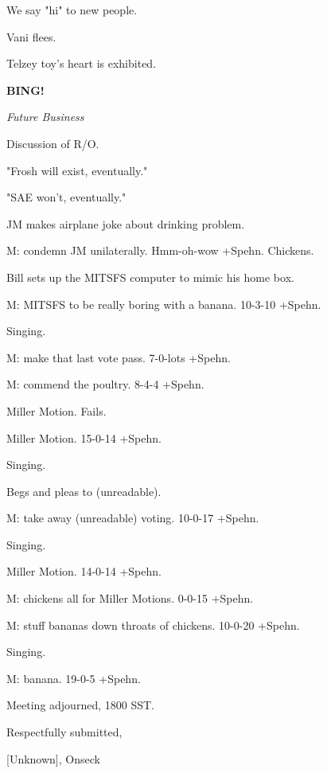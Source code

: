 \documentclass[12pt]{article}
\newcommand{\bing}{{\bf BING!} }
\newcommand{\goto}[1]{\bing \vskip 12pt \centerline{{\em{#1}}}}
\begin{document}
We say "hi" to new people.

Vani flees.

Telzey toy's heart is exhibited.

\goto{Future Business}

Discussion of R/O.

"Frosh will exist, eventually."

"SAE won't, eventually."

JM makes airplane joke about drinking problem.

M: condemn JM unilaterally. Hmm-oh-wow +Spehn. Chickens.

Bill sets up the MITSFS computer to mimic his home box.

M: MITSFS to be really boring with a banana. 10-3-10 +Spehn.

Singing.

M: make that last vote pass. 7-0-lots +Spehn.

M: commend the poultry. 8-4-4 +Spehn.

Miller Motion. Fails.

Miller Motion. 15-0-14 +Spehn.

Singing.

Begs and pleas to (unreadable).

M: take away (unreadable) voting. 10-0-17 +Spehn.

Singing.

Miller Motion. 14-0-14 +Spehn.

M: chickens all for Miller Motions. 0-0-15 +Spehn.

M: stuff bananas down throats of chickens. 10-0-20 +Spehn.

Singing.

M: banana. 19-0-5 +Spehn.

\vspace{12pt}

\noindent
Meeting adjourned, 1800 SST.

\vspace{18pt}

\centerline{Respectfully submitted,}
\centerline{[Unknown], Onseck}
\end{document}
